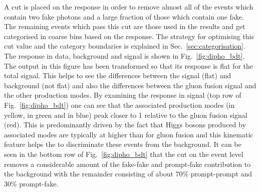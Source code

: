 A cut is placed on the \BDT response in order to remove almost all of the events which contain two fake photons and a large fraction of those which contain one fake. The remaining events which pass this cut are those used in the results and get categorised in coarse bins based on the \BDT response. The strategy for optimising this cut value and the category boundaries is explained in Sec.~\ref{sec:categorisation}. The \BDT response in data, background and signal is shown in Fig.~\ref{fig:dipho_bdt}. The \BDT output in this figure has been transformed so that its response is flat for the total signal. This helps to see the differences between the signal (flat) and background (not flat) and also the differences between the gluon fusion signal and the other production modes. By examining the \BDT response in signal (top row of Fig.~\ref{fig:dipho_bdt}) one can see that the associated production modes (\VBF in yellow, \VH in green and \ttH in blue) peak closer to 1 relative to the gluon fusion signal (red). This is predominantly driven by the fact that Higgs bosons produced by associated modes are typically at higher \pT than for gluon fusion and this kinematic feature helps the \BDT to discriminate these events from the background. It can be seen in the bottom row of Fig.~\ref{fig:dipho_bdt} that the cut on the event level \BDT removes a considerable amount of the fake-fake and prompt-fake contribution to the background with the remainder consisting of about 70\% prompt-prompt and 30\% prompt-fake.


